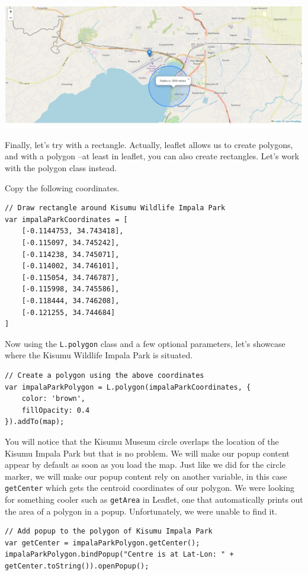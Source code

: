 \documentclass[
]{book}
\begin{document}
\includegraphics[width=26.57in]{../images/circle-radius}

Finally, let's try with a rectangle. Actually, leaflet allows us to create polygons, and with a polygon --at least in leaflet, you can also create rectangles. Let's work with the polygon class instead.

Copy the following coordinates.

\begin{verbatim}
// Draw rectangle around Kisumu Wildlife Impala Park
var impalaParkCoordinates = [
    [-0.1144753, 34.743418],
    [-0.115097, 34.745242],
    [-0.114238, 34.745071],
    [-0.114002, 34.746101],
    [-0.115054, 34.746787],
    [-0.115998, 34.745586],
    [-0.118444, 34.746208],
    [-0.121255, 34.744684]
]
\end{verbatim}

Now using the \texttt{L.polygon} class and a few optional parameters, let's showcase where the Kisumu Wildlife Impala Park is situated.

\begin{verbatim}
// Create a polygon using the above coordinates
var impalaParkPolygon = L.polygon(impalaParkCoordinates, {
    color: 'brown',
    fillOpacity: 0.4
}).addTo(map);
\end{verbatim}

You will notice that the Kisumu Museum circle overlaps the location of the Kisumu Impala Park but that is no problem. We will make our popup content appear by default as soon as you load the map. Just like we did for the circle marker, we will make our popup content rely on another variable, in this case \texttt{getCenter} which gets the centroid coordinates of our polygon. We were looking for something cooler such as \texttt{getArea} in Leaflet, one that automatically prints out the area of a polygon in a popup. Unfortunately, we were unable to find it.

\begin{verbatim}
// Add popup to the polygon of Kisumu Impala Park
var getCenter = impalaParkPolygon.getCenter();
impalaParkPolygon.bindPopup("Centre is at Lat-Lon: " + getCenter.toString()).openPopup();
\end{verbatim}
\end{document}
